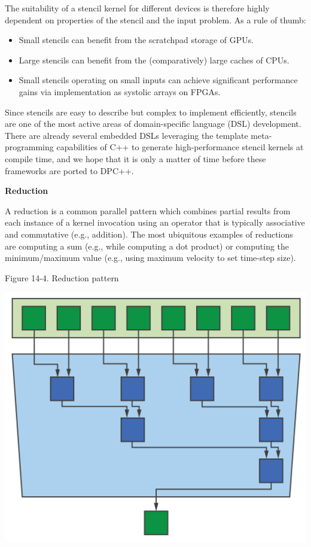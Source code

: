 The suitability of a stencil kernel for different devices is therefore highly dependent on properties of the stencil and the input problem. As a rule of thumb:\par

\begin{itemize}
	\item Small stencils can benefit from the scratchpad storage of GPUs.
	\item Large stencils can benefit from the (comparatively) large caches of CPUs.
	\item Small stencils operating on small inputs can achieve significant performance gains via implementation as systolic arrays on FPGAs.
\end{itemize}

Since stencils are easy to describe but complex to implement efficiently, stencils are one of the most active areas of domain-specific language (DSL) development. There are already several embedded DSLs leveraging the template meta-programming capabilities of C++ to generate high-performance stencil kernels at compile time, and we hope that it is only a matter of time before these frameworks are ported to DPC++.\par

\hspace*{\fill} \par %
\textbf{Reduction}

A reduction is a common parallel pattern which combines partial results from each instance of a kernel invocation using an operator that is typically associative and commutative (e.g., addition). The most ubiquitous examples of reductions are computing a sum (e.g., while computing a dot product) or computing the minimum/maximum value (e.g., using maximum velocity to set time-step size).\par

\hspace*{\fill} \par %
Figure 14-4. Reduction pattern
\begin{center}
	\includegraphics[width=1.\textwidth]{content/chapter-14/images/4}
\end{center}

